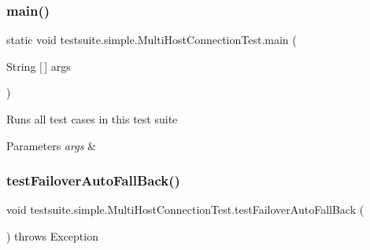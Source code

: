 \subsubsection{\texorpdfstring{main()}{main()}}
{\footnotesize\ttfamily static void testsuite.\+simple.\+Multi\+Host\+Connection\+Test.\+main (\begin{DoxyParamCaption}\item[{String \mbox{[}$\,$\mbox{]}}]{args }\end{DoxyParamCaption})\hspace{0.3cm}{\ttfamily [static]}}

Runs all test cases in this test suite


\begin{DoxyParams}{Parameters}
{\em args} & \\
\hline
\end{DoxyParams}
\mbox{\label{classtestsuite_1_1simple_1_1_multi_host_connection_test_adcb3eebcf1b9b863bf7c3e55e3af53f7}} 
\subsubsection{\texorpdfstring{test\+Failover\+Auto\+Fall\+Back()}{testFailoverAutoFallBack()}}
{\footnotesize\ttfamily void testsuite.\+simple.\+Multi\+Host\+Connection\+Test.\+test\+Failover\+Auto\+Fall\+Back (\begin{DoxyParamCaption}{ }\end{DoxyParamCaption}) throws Exception}

